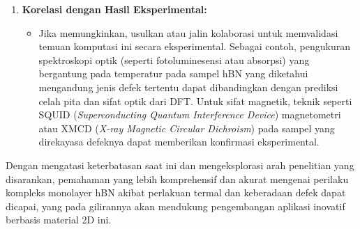 \begin{enumerate}
    \item \textbf{Korelasi dengan Hasil Eksperimental:}
    \begin{itemize}
        \item Jika memungkinkan, usulkan atau jalin kolaborasi untuk memvalidasi temuan komputasi ini secara eksperimental. Sebagai contoh, pengukuran spektroskopi optik (seperti fotoluminesensi atau absorpsi) yang bergantung pada temperatur pada sampel hBN yang diketahui mengandung jenis defek tertentu dapat dibandingkan dengan prediksi celah pita dan sifat optik dari DFT. Untuk sifat magnetik, teknik seperti SQUID (\textit{Superconducting Quantum Interference Device}) magnetometri atau XMCD (\textit{X-ray Magnetic Circular Dichroism}) pada sampel yang direkayasa defeknya dapat memberikan konfirmasi eksperimental.
    \end{itemize}
\end{enumerate}
Dengan mengatasi keterbatasan saat ini dan mengeksplorasi arah penelitian yang disarankan, pemahaman yang lebih komprehensif dan akurat mengenai perilaku kompleks monolayer hBN akibat perlakuan termal dan keberadaan defek dapat dicapai, yang pada gilirannya akan mendukung pengembangan aplikasi inovatif berbasis material 2D ini.

